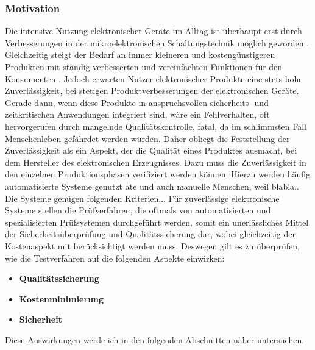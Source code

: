 \subsubsection{Motivation}
    \label{subsubsection: Motivation}
    Die intensive Nutzung elektronischer Geräte im Alltag ist überhaupt erst durch Verbesserungen in der mikroelektronischen Schaltungstechnik möglich geworden \cite{grout_integrated_2006}.
    Gleichzeitig steigt der Bedarf an immer kleineren und kostengünstigeren Produkten mit ständig verbesserten und vereinfachten Funktionen für den Konsumenten \cite{berger_test-_2012}.
    Jedoch erwarten Nutzer elektronischer Produkte eine stets hohe Zuverlässigkeit, bei stetigen Produktverbesserungen der elektronischen Geräte.
    Gerade dann, wenn diese Produkte in anspruchsvollen sicherheits- und zeitkritischen Anwendungen integriert sind, wäre ein Fehlverhalten, oft hervorgerufen durch mangelnde Qualitätskontrolle, fatal, da im schlimmsten Fall Menschenleben gefährdet werden würden.
    Daher obliegt die Feststellung der Zuverlässigkeit als ein Aspekt, der die Qualität eines Produktes ausmacht, bei dem Hersteller des elektronischen Erzeugnisses.
    Dazu muss die Zuverlässigkeit in den einzelnen Produktionsphasen verifiziert werden können.
    Hierzu werden häufig automatisierte Systeme genutzt \ac{ate} und auch manuelle Menschen, weil blabla.. Die Systeme genügen folgenden Kriterien...
    Für zuverlässige elektronische Systeme stellen die Prüfverfahren, die oftmals von automatisierten und spezialisierten Prüfsystemen  durchgeführt werden, somit ein unerlässliches Mittel der Sicherheitsüberprüfung und Qualitätssicherung dar, wobei gleichzeitig der Kostenaspekt mit berücksichtigt werden muss.
    Deswegen gilt es zu überprüfen, wie die Testverfahren auf die folgenden Aspekte einwirken:

    \begin{itemize}
        \item \textbf{Qualitätssicherung}
        \item \textbf{Kostenminimierung}
        \item \textbf{Sicherheit}
    \end{itemize}

    Diese Auswirkungen werde ich in den folgenden Abschnitten näher untersuchen.


